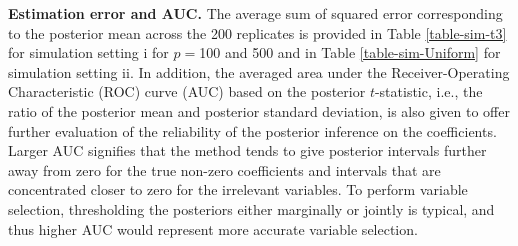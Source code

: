 \documentclass[12pt]{article}
\begin{document}
{\bf Estimation error and AUC.} The  average sum  of squared error corresponding to the posterior mean   across the 200 replicates is provided in Table  \ref{table-sim-t3} for simulation setting i for $p = $100 and 500 and in Table \ref{table-sim-Uniform} for simulation setting ii.  In addition, the averaged area under the  Receiver-Operating Characteristic (ROC) curve (AUC) based on the posterior $t$-statistic, i.e., the ratio of the posterior mean and  posterior standard deviation, is also given   to offer further evaluation of the reliability of the posterior inference on the coefficients. Larger AUC signifies that the method tends to give posterior intervals further away from zero for the true non-zero coefficients and intervals that are concentrated closer to zero for the irrelevant variables.
To perform variable selection, thresholding  the posteriors either marginally or jointly \citep{bondell2012consistent} is typical, and thus higher AUC would represent more accurate variable selection.
\end{document}
